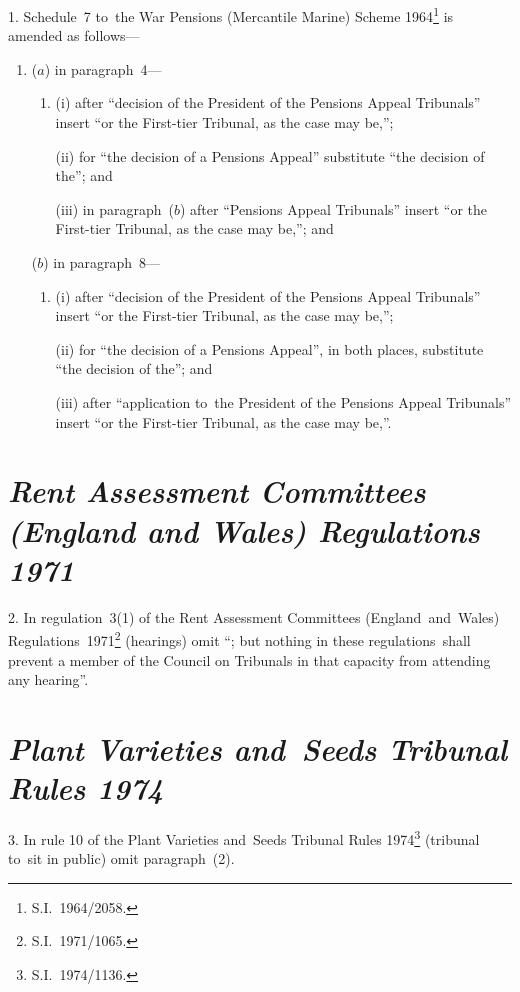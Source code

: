 \documentclass[12pt,a4paper]{article}
\begin{document}
1.  Schedule~7 to~the War Pensions (Mercantile Marine) Scheme 1964\footnote{S.I.~1964/2058.} is amended as follows—
\begin{enumerate}\item[]
($a$) in paragraph~4—
\begin{enumerate}\item[]
(i) after “decision of the President of the Pensions Appeal Tribunals” insert “or the First-tier Tribunal, as the case may be,”;

(ii) for “the decision of a Pensions Appeal” substitute “the decision of the”; and

(iii) in paragraph~($b$)  after “Pensions Appeal Tribunals” insert “or the First-tier Tribunal, as the case may be,”; and
\end{enumerate}

($b$) in paragraph~8—
\begin{enumerate}\item[]
(i) after “decision of the President of the Pensions Appeal Tribunals” insert “or the First-tier Tribunal, as the case may be,”;

(ii) for “the decision of a Pensions Appeal”, in both places, substitute “the decision of the”; and

(iii) after “application to~the President of the Pensions Appeal Tribunals” insert “or the First-tier Tribunal, as the case may be,”.
\end{enumerate}
\end{enumerate}

\section*{\itshape Rent Assessment Committees (England and Wales) Regulations 1971}

2.  In regulation~3(1) of the Rent Assessment Committees (England~and~Wales) Regulations~1971\footnote{S.I.~1971/1065.} (hearings) omit “; but nothing in these regulations~shall prevent a member of the Council on Tribunals in that capacity from attending any hearing”.

\section*{\itshape\sloppy Plant Varieties and~Seeds Tribunal Rules 1974}

3.  In rule 10 of the Plant Varieties and~Seeds Tribunal Rules 1974\footnote{S.I.~1974/1136.} (tribunal to~sit in public) omit paragraph~(2).
\end{document}
